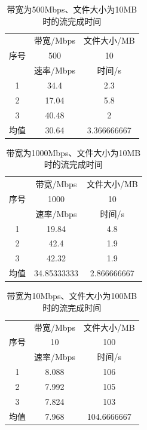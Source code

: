 \documentclass[UTF8]{article}
\begin{document}
\begin{table}[H]
  \centering
  \caption{带宽为500Mbps、文件大小为10MB时的流完成时间}
  \begin{tabular}{|c|c|c|}
    \hline
    \multirow{3}{*}{序号}&带宽/Mbps&文件大小/MB\\
    \cline{2-3}
    &500&10\\
    \cline{2-3}
    &速率/Mbps&时间/s\\
    \hline
    1&34.4&2.3\\
    \hline
    2&17.04&5.8\\
    \hline
    3&40.48&2\\
    \hline
    均值&30.64&3.366666667\\
    \hline
  \end{tabular}
\end{table}

\begin{table}[H]
  \centering
  \caption{带宽为1000Mbps、文件大小为10MB时的流完成时间}
  \begin{tabular}{|c|c|c|}
    \hline
    \multirow{3}{*}{序号}&带宽/Mbps&文件大小/MB\\
    \cline{2-3}
    &1000&10\\
    \cline{2-3}
    &速率/Mbps&时间/s\\
    \hline
    1&19.84&4.8\\
    \hline
    2&42.4&1.9\\
    \hline
    3&42.32&1.9\\
    \hline
    均值&34.85333333&2.866666667\\
    \hline
  \end{tabular}
\end{table}

\begin{table}[H]
  \centering
  \caption{带宽为10Mbps、文件大小为100MB时的流完成时间}
  \begin{tabular}{|c|c|c|}
    \hline
    \multirow{3}{*}{序号}&带宽/Mbps&文件大小/MB\\
    \cline{2-3}
    &10&100\\
    \cline{2-3}
    &速率/Mbps&时间/s\\
    \hline
    1&8.088&106\\
    \hline
    2&7.992&105\\
    \hline
    3&7.824&103\\
    \hline
    均值&7.968&104.6666667\\
    \hline
  \end{tabular}
\end{table}
\end{document}
